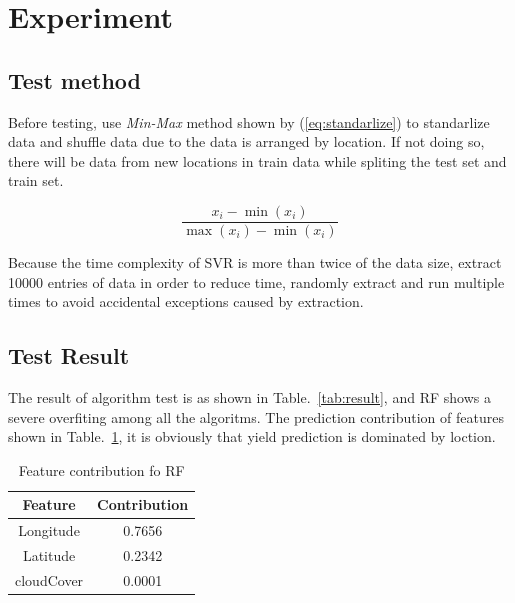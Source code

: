 \documentclass[conference]{IEEEtran}
\begin{document}
\section{Experiment}
\subsection{Test method}
Before testing, use \textit{Min-Max} method shown by (\ref{eq:standarlize}) to standarlize data and shuffle data due to the data is arranged by location. If not doing so, there will be data from new locations in train data while spliting the test set and train set.

\begin{equation}
  \frac{x_i-\min \left( x_i \right)}{\max \left( x_i \right) -\min \left( x_i \right)}
\label{eq:standarlize}
\end{equation}

Because the time complexity of SVR is more than twice of the data size\cite{clarke2005analysis}, extract 10000 entries of data in order to reduce time, randomly extract and run multiple times to avoid accidental exceptions caused by extraction.



\subsection{Test Result}
The result of algorithm test is as shown in Table.~\ref{tab:result}, and RF shows a severe overfiting among all the algoritms. The prediction contribution of features shown in Table.~\ref{tab:RF_contribution}, it is obviously that yield prediction is dominated by loction.

\begin{table}[htbp]
  \caption{Feature contribution fo RF}
  \begin{center}
  \begin{tabular}{|c|c|}
  \hline
    Feature & Contribution \\
  \hline
    Longitude & 0.7656 \\
    Latitude & 0.2342 \\
    cloudCover & 0.0001 \\
  \hline
  \end{tabular}
  \label{tab:RF_contribution}
  \end{center}
\end{table}
\end{document}
